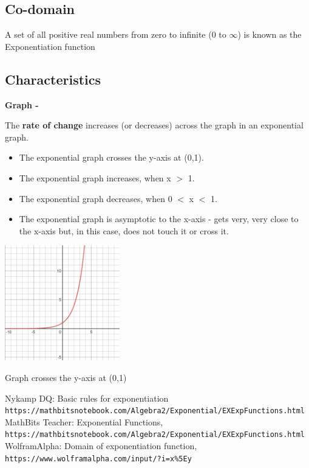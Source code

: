 \documentclass[a4paper, 11pt]{report}
\begin{document}
\subsection*{Co-domain}
A set of all positive real numbers from zero to infinite (0 to \(\infty\)) is known as the Exponentiation function
\subsection*{Characteristics}
\begin{flushleft}
\textbf{Graph - }
 \end{flushleft}
\begin{flushleft}
\cite{mathbits}\cite{wolframalpha} The \textbf{rate of change} increases (or decreases) across the graph in an exponential graph.
\end{flushleft}
\begin{itemize}
\item \label{graph} The exponential graph crosses the y-axis at (0,1). 
\item The exponential graph increases, when x \(>\) 1.
\item The exponential graph decreases, when 0 \(<\) x \(<\) 1.
\item The exponential graph is asymptotic to the x-axis - gets very, very close to the x-axis but, in this case, does not touch it or cross it.
\end{itemize}
\begin{center}
\includegraphics[width=5cm]{x^y}
\end{center}
\begin{center}
Graph crosses the y-axis at (0,1)\end{center}
\begin{thebibliography}{}
Nykamp DQ: Basic rules for exponentiation
\\\texttt{https://mathbitsnotebook.com/Algebra2/Exponential/EXExpFunctions.html}
MathBits Teacher: Exponential Functions,
\\\texttt{https://mathbitsnotebook.com/Algebra2/Exponential/EXExpFunctions.html}
WolframAlpha: Domain of exponentiation function,
\\\texttt{https://www.wolframalpha.com/input/?i=x\%5Ey}
\end{thebibliography}
\newpage
{}
\end{document}
